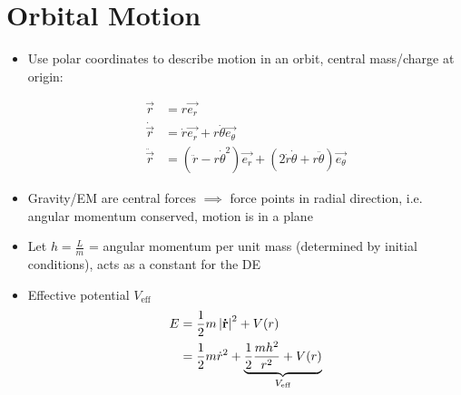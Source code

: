 \section{Orbital Motion}
\begin{itemize}
    \item Use polar coordinates to describe motion in an orbit, central mass/charge at origin:

          \begin{align*}
              \vec{r}        & = r \vec{e_r}                                                                                             \\
              \dot{\vec{r}}  & = \dot{r} \vec{e_r} + r \dot{\theta} \vec{e_{\theta}}                                                     \\
              \ddot{\vec{r}} & = (\ddot{r} - r \dot{\theta}^2 ) \vec{e_r} + (2 \dot{r} \dot{\theta} + r \ddot{\theta} ) \vec{e_{\theta}}
          \end{align*}

    \item Gravity/EM are central forces $\implies$ force points in radial direction, i.e. angular momentum conserved, motion is in a plane
    \item Let $h = \frac{L}{m}$ = angular momentum per unit mass (determined by initial conditions), acts as a constant for the DE
    \item Effective potential $V_{\textrm{eff}}$
          \begin{align*}
              E & = \frac{1}{2} m \left| \boldsymbol{\mathbf{\dot{r}}} \right|^2  + V(r)                                  \\
                & = \frac{1}{2} m \dot{r}^2 + \underbrace{\frac{1}{2} \frac{mh^2}{r^2} + V(r)}_{
              V_{\textrm{eff}}}
          \end{align*}


\end{itemize}
